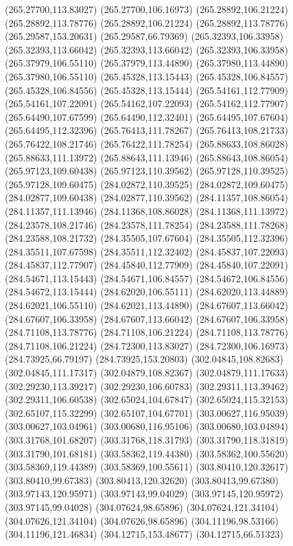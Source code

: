 {(265.27700,113.83027) (265.27700,106.16973) (265.28892,106.21224) (265.28892,113.78776) (265.28892,106.21224) (265.28892,113.78776) (265.29587,153.20631) (265.29587,66.79369)
(265.32393,106.33958) (265.32393,113.66042) (265.32393,113.66042) (265.32393,106.33958) (265.37979,106.55110) (265.37979,113.44890) (265.37980,113.44890) (265.37980,106.55110)
(265.45328,113.15443) (265.45328,106.84557) (265.45328,106.84556) (265.45328,113.15444) (265.54161,112.77909) (265.54161,107.22091) (265.54162,107.22093) (265.54162,112.77907)
(265.64490,107.67599) (265.64490,112.32401) (265.64495,107.67604) (265.64495,112.32396) (265.76413,111.78267) (265.76413,108.21733) (265.76422,108.21746) (265.76422,111.78254)
(265.88633,108.86028) (265.88633,111.13972) (265.88643,111.13946) (265.88643,108.86054) (265.97123,109.60438) (265.97123,110.39562) (265.97128,110.39525) (265.97128,109.60475)
(284.02872,110.39525) (284.02872,109.60475) (284.02877,109.60438) (284.02877,110.39562) (284.11357,108.86054) (284.11357,111.13946) (284.11368,108.86028) (284.11368,111.13972)
(284.23578,108.21746) (284.23578,111.78254) (284.23588,111.78268) (284.23588,108.21732) (284.35505,107.67604) (284.35505,112.32396) (284.35511,107.67598) (284.35511,112.32402)
(284.45837,107.22093) (284.45837,112.77907) (284.45840,112.77909) (284.45840,107.22091) (284.54671,113.15443) (284.54671,106.84557) (284.54672,106.84556) (284.54672,113.15444)
(284.62020,106.55111) (284.62020,113.44889) (284.62021,106.55110) (284.62021,113.44890) (284.67607,113.66042) (284.67607,106.33958) (284.67607,113.66042) (284.67607,106.33958)
(284.71108,113.78776) (284.71108,106.21224) (284.71108,113.78776) (284.71108,106.21224) (284.72300,113.83027) (284.72300,106.16973) (284.73925,66.79197) (284.73925,153.20803)
(302.04845,108.82683) (302.04845,111.17317) (302.04879,108.82367) (302.04879,111.17633) (302.29230,113.39217) (302.29230,106.60783) (302.29311,113.39462) (302.29311,106.60538)
(302.65024,104.67847) (302.65024,115.32153) (302.65107,115.32299) (302.65107,104.67701) (303.00627,116.95039) (303.00627,103.04961) (303.00680,116.95106) (303.00680,103.04894)
(303.31768,101.68207) (303.31768,118.31793) (303.31790,118.31819) (303.31790,101.68181) (303.58362,119.44380) (303.58362,100.55620) (303.58369,119.44389) (303.58369,100.55611)
(303.80410,120.32617) (303.80410,99.67383) (303.80413,120.32620) (303.80413,99.67380) (303.97143,120.95971) (303.97143,99.04029) (303.97145,120.95972) (303.97145,99.04028)
(304.07624,98.65896) (304.07624,121.34104) (304.07626,121.34104) (304.07626,98.65896) (304.11196,98.53166) (304.11196,121.46834) (304.12715,153.48677) (304.12715,66.51323)
}
